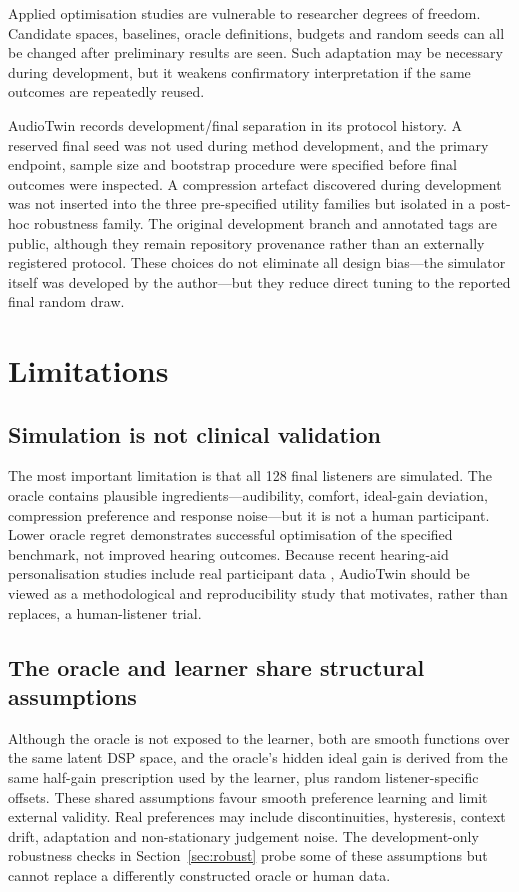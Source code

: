 \documentclass[preprint,12pt]{elsarticle}
\begin{document}
Applied optimisation studies are vulnerable to researcher degrees of freedom. Candidate spaces, baselines, oracle definitions, budgets and random seeds can all be changed after preliminary results are seen. Such adaptation may be necessary during development, but it weakens confirmatory interpretation if the same outcomes are repeatedly reused.

AudioTwin records development/final separation in its protocol history. A reserved final seed was not used during method development, and the primary endpoint, sample size and bootstrap procedure were specified before final outcomes were inspected. A compression artefact discovered during development was not inserted into the three pre-specified utility families but isolated in a post-hoc robustness family. The original development branch and annotated tags are public, although they remain repository provenance rather than an externally registered protocol. These choices do not eliminate all design bias---the simulator itself was developed by the author---but they reduce direct tuning to the reported final random draw.

\section{Limitations}
\label{sec:limitations}

\subsection{Simulation is not clinical validation}

The most important limitation is that all 128 final listeners are simulated. The oracle contains plausible ingredients---audibility, comfort, ideal-gain deviation, compression preference and response noise---but it is not a human participant. Lower oracle regret demonstrates successful optimisation of the specified benchmark, not improved hearing outcomes. Because recent hearing-aid personalisation studies include real participant data \cite{vyas2022,akbarzadeh2022,ni2024}, AudioTwin should be viewed as a methodological and reproducibility study that motivates, rather than replaces, a human-listener trial.

\subsection{The oracle and learner share structural assumptions}

Although the oracle is not exposed to the learner, both are smooth functions over the same latent DSP space, and the oracle's hidden ideal gain is derived from the same half-gain prescription used by the learner, plus random listener-specific offsets. These shared assumptions favour smooth preference learning and limit external validity. Real preferences may include discontinuities, hysteresis, context drift, adaptation and non-stationary judgement noise. The development-only robustness checks in Section~\ref{sec:robust} probe some of these assumptions but cannot replace a differently constructed oracle or human data.
\end{document}
